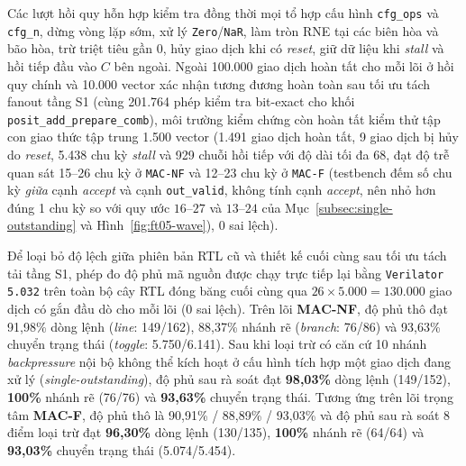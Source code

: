 Các lượt hồi quy hỗn hợp kiểm tra đồng thời mọi tổ hợp cấu hình \texttt{cfg\_ops}
và \texttt{cfg\_n}, dừng vòng lặp sớm, xử lý \texttt{Zero}/\texttt{NaR}, làm tròn
RNE tại các biên hòa và bão hòa, trừ triệt tiêu gần $0$, hủy giao dịch khi có
\textit{reset}, giữ dữ liệu khi \textit{stall} và hồi tiếp đầu vào $C$ bên ngoài.
Ngoài 100.000 giao dịch hoàn tất cho mỗi lõi ở hồi quy chính và 10.000 vector xác
nhận tương đương hoàn toàn sau tối ưu tách fanout tầng S1 (cùng 201.764 phép kiểm
tra bit-exact cho khối \texttt{posit\_add\_prepare\_comb}), môi trường kiểm chứng
còn hoàn tất kiểm thử tập con giao thức tập trung 1.500 vector (1.491 giao dịch
hoàn tất, 9 giao dịch bị hủy do \textit{reset}, 5.438 chu kỳ \textit{stall} và
929 chuỗi hồi tiếp với độ dài tối đa 68, đạt độ trễ quan sát 15--26 chu kỳ ở
\texttt{MAC-NF} và 12--23 chu kỳ ở \texttt{MAC-F} (testbench đếm số chu kỳ
\textit{giữa} cạnh \textit{accept} và cạnh \texttt{out\_valid}, không tính cạnh
\textit{accept}, nên nhỏ hơn đúng 1 chu kỳ so với quy ước $16\text{--}27$ và
$13\text{--}24$ của Mục~\ref{subsec:single-outstanding} và Hình~\ref{fig:ft05-wave}), $0$ sai lệch).

Để loại bỏ độ lệch giữa phiên bản RTL cũ và thiết kế cuối cùng sau tối ưu tách tải
tầng S1, phép đo độ phủ mã nguồn được chạy trực tiếp lại bằng \texttt{Verilator 5.032}
trên toàn bộ cây RTL đóng băng cuối cùng qua $26 \times 5.000 = 130.000$ giao dịch
có gắn đầu dò cho mỗi lõi ($0$ sai lệch). Trên lõi \textbf{MAC-NF}, độ phủ thô
đạt 91,98\% dòng lệnh (\textit{line}: 149/162), 88,37\% nhánh rẽ (\textit{branch}: 76/86)
và 93,63\% chuyển trạng thái (\textit{toggle}: 5.750/6.141). Sau khi loại trừ có căn cứ
10 nhánh \textit{backpressure} nội bộ không thể kích hoạt ở cấu hình tích hợp một
giao dịch đang xử lý (\textit{single-outstanding}), độ phủ sau rà soát đạt
\textbf{98,03\%} dòng lệnh (149/152), \textbf{100\%} nhánh rẽ (76/76) và \textbf{93,63\%}
chuyển trạng thái. Tương ứng trên lõi trọng tâm \textbf{MAC-F}, độ phủ thô là
90,91\% / 88,89\% / 93,03\% và độ phủ sau rà soát 8 điểm loại trừ đạt
\textbf{96,30\%} dòng lệnh (130/135), \textbf{100\%} nhánh rẽ (64/64) và \textbf{93,03\%}
chuyển trạng thái (5.074/5.454).

